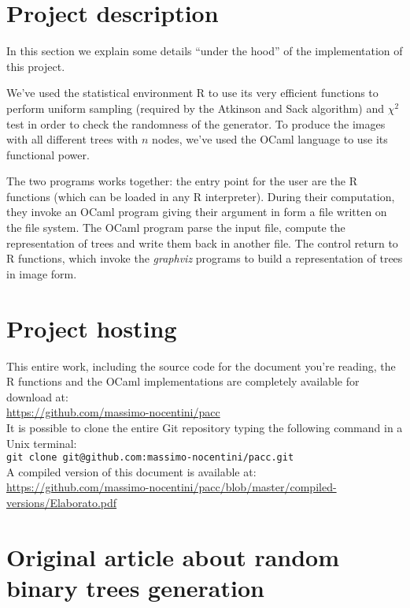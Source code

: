 \documentclass[twoside,openright,titlepage,fleqn,
	headinclude,11pt,a4paper,BCOR5mm,footinclude
	]{scrbook}
\begin{document}
\section{Project description}

In this section we explain some details ``under the hood'' of the
implementation of this project.

We've used the statistical environment R to use its very efficient
functions to perform uniform sampling (required by the Atkinson and
Sack algorithm) and $\chi^2$ test in order to check the randomness of
the generator. To produce the images with all different trees with $n$
nodes, we've used the OCaml language to use its functional power.

The two programs works together: the entry point for the user are the
R functions (which can be loaded in any R interpreter). During their
computation, they invoke an OCaml program giving their argument in
form a file written on the file system. The OCaml program parse the
input file, compute the representation of trees and write them back in
another file. The control return to R functions, which invoke the
\emph{graphviz} programs to build a representation of trees in image
form.

\section{Project hosting}

This entire work, including the source code for the document you're
reading, the R functions and the OCaml implementations are completely
available for download at:\\
\href{https://github.com/massimo-nocentini/pacc}{https://github.com/massimo-nocentini/pacc}\\
It is possible to clone the entire Git repository typing the following
command in a Unix terminal:\\
\texttt{git clone git@github.com:massimo-nocentini/pacc.git}\\
A compiled version of this document is available at: \\
\href{https://github.com/massimo-nocentini/pacc/blob/master/compiled-versions/Elaborato.pdf}{https://github.com/massimo-nocentini/pacc/blob/master/compiled-versions/Elaborato.pdf}

\section{Original article about random binary trees generation}
\end{document}

